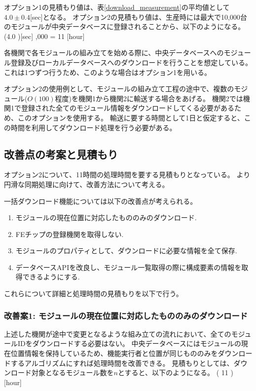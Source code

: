 オプション1の見積もり値は、表\ref{download_measurement}の平均値として$4.0\pm0.4$[sec]となる。
オプション2の見積もり値は、生産時には最大で10,000台のモジュールが中央データベースに登録されることから、以下のようになる。
\bbb
(4.0 )[\rm{sec}] ,000 = 11  [{\rm hour}]
\eee

各機関で各モジュールの組み立てを始める際に、中央データベースへのモジュール登録及びローカルデータベースへのダウンロードを行うことを想定している。
これは1つずつ行うため、このような場合はオプション1を用いる。

オプション2の使用例として、モジュールの組み立て工程の途中で、複数のモジュール($O(100)$程度)を機関1から機関2に輸送する場合をあげる。
機関2では機関1で登録された全てのモジュール情報をダウンロードしてくる必要があるため、このオプションを使用する。
輸送に要する時間として1日と仮定すると、この時間を利用してダウンロード処理を行う必要がある。

\subsection{改善点の考案と見積もり}

オプション2について、11時間の処理時間を要する見積もりとなっている。
より円滑な同期処理に向けて、改善方法について考える。

一括ダウンロード機能については以下の改善点が考えられる。
\begin{enumerate}
  \item モジュールの現在位置に対応したもののみのダウンロード.
  \item FEチップの登録機関を取得しない.
  \item モジュールのプロパティとして、ダウンロードに必要な情報を全て保存.
  \item データベースAPIを改良し、モジュール一覧取得の際に構成要素の情報を取得できるようにする.
\end{enumerate}

これらについて詳細と処理時間の見積もりを以下で行う。

\subsubsection{改善案1: モジュールの現在位置に対応したもののみのダウンロード}
上述した機関が途中で変更となるような組み立ての流れにおいて、全てのモジュールIDをダウンロードする必要はない。
中央データベースにはモジュールの現在位置情報を保持しているため、機能実行者と位置が同じもののみをダウンロードするアルゴリズムにすれば処理時間を改善できる。
見積もりとしては、ダウンロード対象となるモジュール数を$n$とすると、以下のようになる。
\bbb
( 11  ) \times {} [{\rm hour}]
\eee

